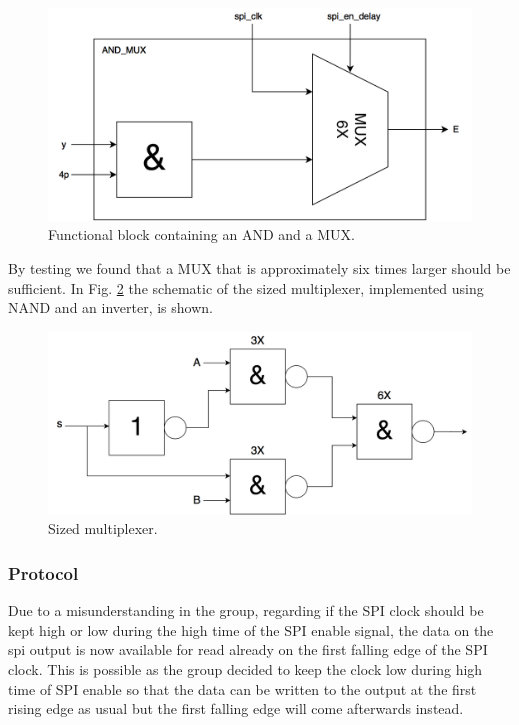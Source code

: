 \begin{figure}[H]
\centering
\captionsetup{justification=centering}
\includegraphics[scale=0.2]{../figures/AND_MUX.png}
\caption{Functional block containing an AND and a MUX.}
\label{and_mux}
\end{figure}

\raggedright By testing we found that a MUX that is approximately six times larger should be sufficient. In Fig. \ref{mux6x} the schematic of the sized multiplexer, implemented using NAND and an inverter, is shown.

\begin{figure}[H]
\centering
\captionsetup{justification=centering}
\includegraphics[scale=0.2]{../figures/MUX6X.png}
\caption{Sized multiplexer.}
\label{mux6x}
\end{figure}


\subsubsection{Protocol}
Due to a misunderstanding in the group, regarding if the SPI clock should be kept high or low during the high time of the SPI enable signal, the data on the spi output is now available for read already on the first falling edge of the SPI clock. This is possible as the group decided to keep the clock low during high time of SPI enable so that the data can be written to the output at the first rising edge as usual but the first falling edge will come afterwards instead.



